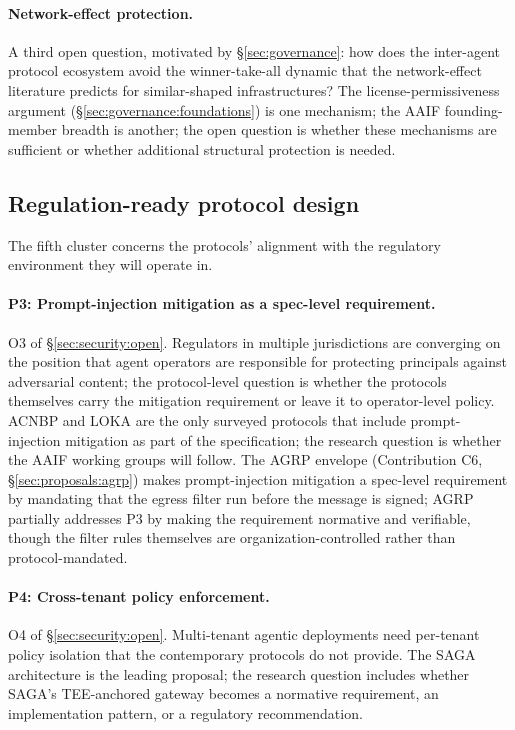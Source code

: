 \paragraph{Network-effect protection.}
A third open question, motivated by
\S\ref{sec:governance}: how does the
inter-agent protocol ecosystem avoid the
winner-take-all dynamic that the network-effect
literature predicts for similar-shaped
infrastructures? The
license-permissiveness argument
(\S\ref{sec:governance:foundations}) is one
mechanism; the AAIF founding-member breadth is
another; the open question is whether these
mechanisms are sufficient or whether
additional structural protection is needed.

\subsection{Regulation-ready protocol design}
\label{sec:openproblems:regulation}

The fifth cluster concerns the protocols' alignment
with the regulatory environment they will operate in.

\paragraph{P3: Prompt-injection mitigation as a
spec-level requirement.}
O3 of \S\ref{sec:security:open}. Regulators in
multiple jurisdictions are converging on the
position that agent operators are responsible
for protecting principals against adversarial
content; the protocol-level question is
whether the protocols themselves carry the
mitigation requirement or leave it to
operator-level policy. ACNBP and LOKA are the
only surveyed protocols that include
prompt-injection mitigation as part of the
specification; the research question is whether
the AAIF working groups will follow. The AGRP
envelope (Contribution C6,
\S\ref{sec:proposals:agrp}) makes
prompt-injection mitigation a spec-level requirement
by mandating that the egress filter run before the
message is signed; AGRP partially addresses P3 by
making the requirement normative and verifiable,
though the filter rules themselves are
organization-controlled rather than
protocol-mandated.

\paragraph{P4: Cross-tenant policy enforcement.}
O4 of \S\ref{sec:security:open}. Multi-tenant
agentic deployments need per-tenant policy
isolation that the contemporary protocols do
not provide. The SAGA architecture is the
leading proposal; the research question
includes whether SAGA's TEE-anchored gateway
becomes a normative requirement, an
implementation pattern, or a regulatory
recommendation.

